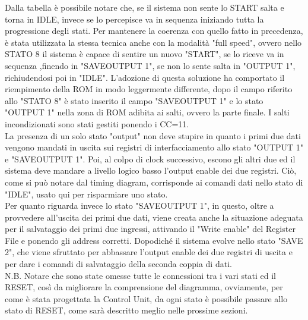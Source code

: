 \documentclass[a4paper, titlepage]{article}
\begin{document}
Dalla tabella è possibile notare che, se il sistema non sente lo START salta e torna in IDLE, invece se lo percepisce va in sequenza iniziando tutta la progressione degli stati. Per mantenere la coerenza con quello fatto in precedenza, è stata utilizzata la stessa tecnica anche con la modalità "full speed", ovvero nello STATO 8 il sistema è capace di sentire un nuovo "START", se lo riceve va in sequenza ,finendo in "SAVE\textunderscore OUTPUT 1", se non lo sente salta in "OUTPUT 1", richiudendosi poi in "IDLE". L'adozione di questa soluzione ha comportato il riempimento della ROM in modo leggermente differente, dopo il campo riferito allo "STATO 8" è stato inserito il campo "SAVE\textunderscore OUTPUT 1" e lo stato "OUTPUT 1" nella zona di ROM adibita ai salti, ovvero la parte finale. I salti incondizionati sono stati gestiti ponendo i CC=11. \\
La presenza di un solo stato "output" non deve stupire in quanto i primi due dati  vengono mandati in uscita sui registri di interfacciamento allo stato "OUTPUT 1" e "SAVE\textunderscore OUTPUT 1". Poi, al colpo di clock successivo, escono gli altri due ed il sistema deve mandare a livello logico basso l'output enable dei due registri. Ciò, come si può notare dal timing diagram, corrisponde ai comandi dati nello stato di "IDLE", usato qui per risparmiare uno stato.\\Per quanto riguarda invece lo stato "SAVE\textunderscore OUTPUT 1", in questo, oltre a provvedere all'uscita dei primi due dati, viene creata anche la situazione adeguata per il salvataggio dei primi due ingressi, attivando il "Write enable" del Register File e ponendo  gli address corretti. Dopodiché il sistema evolve nello stato "SAVE 2", che viene sfruttato per abbassare l'output enable dei due registri di uscita e per dare i comandi di salvataggio della seconda coppia di dati.
\\N.B. Notare che sono state omesse tutte le connessioni tra i vari stati ed il RESET, così da migliorare la comprensione del diagramma, ovviamente, per come è stata progettata la Control Unit, da ogni stato è possibile passare allo stato di RESET, come sarà descritto meglio nelle prossime sezioni.
\end{document}
